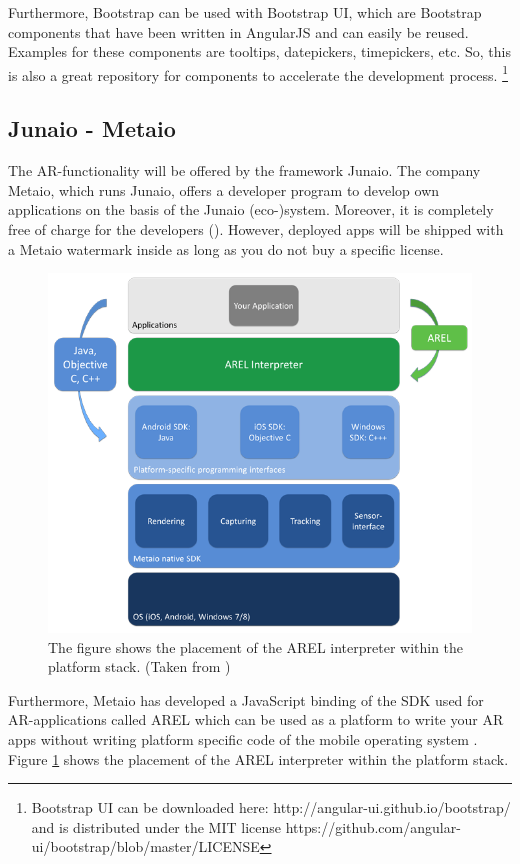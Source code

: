 Furthermore, Bootstrap can be used with Bootstrap UI, which are Bootstrap components that have been written in AngularJS and can easily be reused. Examples for these components are tooltips, datepickers, timepickers, etc. So, this is also a great repository for components to accelerate the development process. \footnote{Bootstrap UI can be downloaded here: http://angular-ui.github.io/bootstrap/ and is distributed under the MIT license https://github.com/angular-ui/bootstrap/blob/master/LICENSE}

\subsection{Junaio - Metaio}
The \ac{AR}-functionality will be offered by the framework Junaio. The company Metaio, which runs Junaio, offers a developer program to develop own applications on the basis of the Junaio (eco-)system. Moreover, it is completely free of charge for the developers (\cite{junaio1}). However, deployed apps will be shipped with a Metaio watermark inside as long as you do not buy a specific license. 

\begin{figure}[th]
\centerline{\includegraphics[width=.7\textwidth]{gfx/stackAREL}}
\caption{The figure shows the placement of the AREL interpreter within the platform stack. (Taken from \cite{MetaioDEV})}
\label{stackArel}
\end{figure}

Furthermore, Metaio has developed a JavaScript binding of the SDK used for \ac{AR}-applications called \ac{AREL} which can be used as a platform to write your \ac{AR} apps without writing platform specific code of the mobile operating system \cite{MetaioDEV}. Figure \ref{stackArel} shows the placement of the \ac{AREL} interpreter within the platform stack. 

